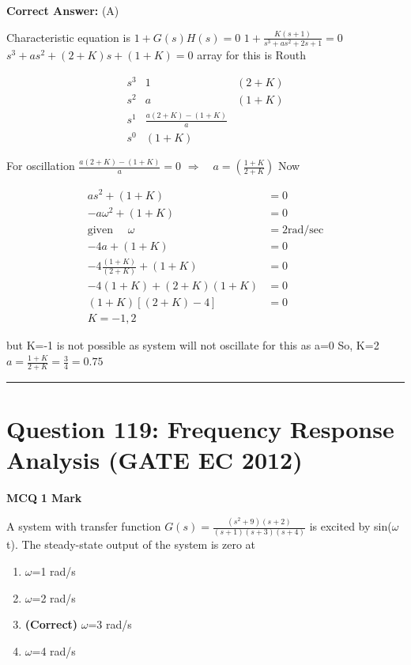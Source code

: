 \documentclass[11pt,a4paper]{article}
\begin{document}
\noindent \textbf{Correct Answer:} (A)

\begin{tcolorbox}[solbox, title=Detailed Solution -- Question 118]
Characteristic equation is
$1+G(s)H(s)=0$
$1+\frac{K(s+1)}{s^{3}+a s^{2}+2 s+1}=0$
$s^{3}+a s^{2}+(2+K) s+(1+K)=0$
 array for this is Routh

\[
\begin{array}{l|lr} s^{3} & 1 & (2+K) \\ s^{2} & a & (1+K) \\ s^{1} & \frac{a(2+K)-(1+K)}{a} \\ s^{0} & (1+K) & \end{array}
\]

 For oscillation $\frac{a(2+K)-(1+K)}{a}=0$
$\Rightarrow \quad a=\left(\frac{1+K}{2+K}\right)$
 Now 

\[
\begin{aligned} a s^{2}+(1+K)&=0 \\ -a \omega^{2}+(1+K)&=0 \\ \text{given }\quad \omega&=2 \mathrm{rad} / \mathrm{sec} \\ -4 a+(1+K)&=0 \\ -4 \frac{(1+K)}{(2+K)}+(1+K)&=0 \\ -4(1+K)+(2+K)(1+K)&=0 \\ (1+K)[(2+K)-4]&=0 \\ K=-1,2 \end{aligned}
\]

 but K=-1 is not possible as system will not  oscillate for this as a=0 
 So, K=2 
$a=\frac{1+K}{2+K}=\frac{3}{4}=0.75$
\end{tcolorbox}

\vspace{1.5em}
\hrule
\vspace{1.5em}

\section*{Question 119: Frequency Response Analysis (GATE EC 2012)}
\noindent \textbf{\color{primary}MCQ} \hfill \textbf{\color{secondary}1 Mark}


\noindent A system with transfer function
 $G(s)=\frac{(s^{2}+9)(s+2)}{(s+1)(s+3)(s+4)}$ 
is excited by sin($\omega$ t). The steady-state output of the system is zero at


\begin{enumerate}[label=(\Alph*)]
    \item $\omega$=1 rad/s
    \item $\omega$=2 rad/s
    \item \textbf{(Correct)} $\omega$=3 rad/s
    \item $\omega$=4 rad/s
\end{enumerate}
\end{document}
